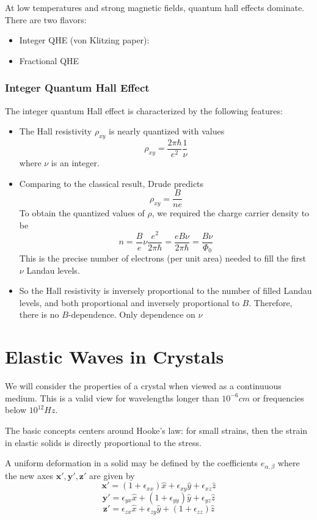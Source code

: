 \documentclass[10pt]{article}
\begin{document}
At low temperatures and strong magnetic fields, quantum hall effects dominate. There are two flavors:
\begin{itemize}
  \item Integer QHE (von Klitzing paper):
  \item Fractional QHE
\end{itemize}

\subsubsection{Integer Quantum Hall Effect}
The integer quantum Hall effect is characterized by the following features:
\begin{itemize}
  \item The Hall resistivity $\rho_{xy}$ is nearly quantized with values
  $$
    \rho_{xy} = \frac{2\pi\hbar}{e^{2}}\frac{1}{\nu}
  $$
  where $\nu$ is an integer.
  \item Comparing to the classical result, Drude predicts
  $$
    \rho_{xy} = \frac{B}{ne}
  $$
  To obtain the quantized values of $\rho$, we required the charge carrier density to be
  $$
    n = \frac{B}{e}\nu\frac{e^{2}}{2\pi\hbar} = \frac{eB\nu}{2\pi\hbar} = \frac{B\nu}{\Phi_{0}}
  $$
  This is the precise number of electrons (per unit area) needed to fill the first $\nu$ Landau levels.
  \item So the Hall resistivity is inversely proportional to the number of filled Landau levels, and both proportional and inversely proportional to $B$. Therefore, there is no $B$-dependence. Only dependence on $\nu$
\end{itemize}

\section{Elastic Waves in Crystals}
We will consider the properties of a crystal when viewed as a continuuous medium. This is
a valid view for wavelengths longer than $10^{-6} cm$ or frequencies below $10^{12} Hz$.

The basic concepts centers around Hooke's law: for small strains, then the strain in elastic
solids is directly proportional to the stress.

A uniform deformation in a solid may be defined by the coefficients $e_{\alpha, \beta}$ where
the new axes $\textbf{x}', \textbf{y}', \textbf{z}'$ are given by
$$\textbf{x}' = (1+\epsilon_{xx})\hat{x} + \epsilon_{xy}\hat{y} + \epsilon_{xz}\hat{z}$$
$$\textbf{y}' = \epsilon_{yx}\hat{x} + (1+\epsilon_{yy})\hat{y} + \epsilon_{yz}\hat{z}$$
$$\textbf{z}' = \epsilon_{zx}\hat{x} + \epsilon_{zy}\hat{y} + (1+\epsilon_{zz})\hat{z}$$
\end{document}
